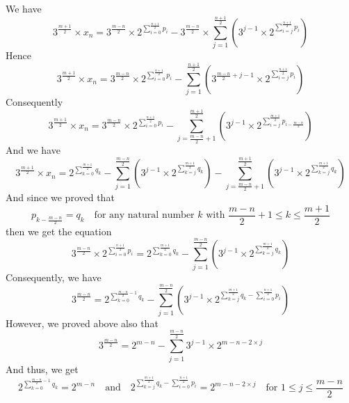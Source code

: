 \documentclass[11pt,a4paper]{article}
\theoremstyle{definition}
\begin{document}
We have
\begin{equation}
3^{\frac{m+1}{2}}\times x_n=3^{\frac{m-n}{2}}\times 2^{\sum_{i=0}^{\frac{n+1}{2}}p_i}-3^{\frac{m-n}{2}}\times\sum_{j=1}^{\frac{n+1}{2}}\left(3^{j-1}\times 2^{\sum_{i=j}^{\frac{n+1}{2}}p_i}\right)
\end{equation}
Hence
\begin{equation}
3^{\frac{m+1}{2}}\times x_n=3^{\frac{m-n}{2}}\times 2^{\sum_{i=0}^{\frac{n+1}{2}}p_i}-\sum_{j=1}^{\frac{n+1}{2}}\left(3^{\frac{m-n}{2}+j-1}\times 2^{\sum_{i=j}^{\frac{n+1}{2}}p_i}\right)
\end{equation}
Consequently
\begin{equation}
3^{\frac{m+1}{2}}\times x_n=3^{\frac{m-n}{2}}\times 2^{\sum_{i=0}^{\frac{n+1}{2}}p_i}-\sum_{j=\frac{m-n}{2}+1}^{\frac{m+1}{2}}\left(3^{j-1}\times 2^{\sum_{i=j}^{\frac{m+1}{2}}p_{i-\frac{m-n}{2}}}\right)
\end{equation}
And we have
\begin{equation}
3^{\frac{m+1}{2}}\times x_n=2^{\sum_{k=0}^{\frac{m+1}{2}}q_k}-\sum_{j=1}^{\frac{m-n}{2}}\left(3^{j-1}\times 2^{\sum_{k=j}^{\frac{m+1}{2}}q_k}\right)-\sum_{j=\frac{m-n}{2}+1}^{\frac{m+1}{2}}\left(3^{j-1}\times 2^{\sum_{k=j}^{\frac{m+1}{2}}q_k}\right)
\end{equation}
And since we proved that
\begin{equation}
p_{k-\frac{m-n}{2}}=q_k\quad\text{for any natural number }k\text{ with }\frac{m-n}{2}+1\le k\le\frac{m+1}{2}
\end{equation}
then we get the equation
\begin{equation}
3^{\frac{m-n}{2}}\times 2^{\sum_{i=0}^{\frac{n+1}{2}}p_i}=2^{\sum_{k=0}^{\frac{m+1}{2}}q_k}-\sum_{j=1}^{\frac{m-n}{2}}\left(3^{j-1}\times 2^{\sum_{k=j}^{\frac{m+1}{2}}q_k}\right)
\end{equation}
Consequently, we have
\begin{equation}
3^{\frac{m-n}{2}}=2^{\sum_{k=0}^{\frac{m-n}{2}-1}q_k}-\sum_{j=1}^{\frac{m-n}{2}}\left(3^{j-1}\times 2^{\sum_{k=j}^{\frac{m+1}{2}}q_k-\sum_{i=0}^{\frac{n+1}{2}}p_i}\right)
\end{equation}
However, we proved above also that
\begin{equation}
3^{\frac{m-n}{2}}=2^{m-n}-\sum_{j=1}^{\frac{m-n}{2}}3^{j-1}\times 2^{m-n-2\times j}
\end{equation}
And thus, we get
\begin{equation}
2^{\sum_{k=0}^{\frac{m-n}{2}-1}q_k}=2^{m-n}\quad\text{and}\quad
2^{\sum_{k=j}^{\frac{m+1}{2}}q_k-\sum_{i=0}^{\frac{n+1}{2}}p_i}=2^{m-n-2\times j}\quad\text{for }1\le j\le\frac{m-n}{2}
\end{equation}
\end{document}
